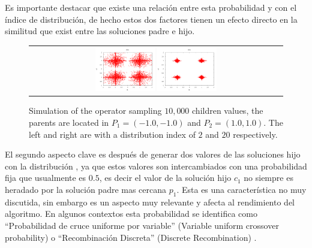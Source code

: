 %
Es importante destacar que existe una relación entre esta probabilidad y con el índice de distribución, de hecho estos dos factores tienen un efecto directo en la similitud que exist entre las soluciones padre e hijo.
%
%
\begin{figure}[t]
\centering
\begin{tabular}{c}
   \includegraphics[width=0.24\textwidth]{img/Operadores/SBX_eta_2.png}  %
   \includegraphics[width=0.24\textwidth]{img/Operadores/SBX_eta_20.png} 
\end{tabular}
\caption{Simulation of the \SBX{} operator sampling $10,000$ children values, the parents are located in $P_1=(-1.0, -1.0)$ and $P_2=(1.0, 1.0)$. The left and right are with a distribution index of $2$ and $20$ respectively.}
\label{fig:Simulation_Case_3}
\end{figure}

El segundo aspecto clave es después de generar dos valores de las soluciones hijo con la distribución \SBX{}, ya que estos valores son intercambiados con una probabilidad fija que usualmente es $0.5$, es decir el valor de la solución hijo $c_1$ no siempre es heradado por la solución padre mas cercana $p_1$.
%
Esta es una característica no muy discutida, sin embargo es un aspecto muy relevante y afecta al rendimiento del algoritmo.
%
En algunos contextos esta probabilidad se identifica como ``Probabilidad de cruce uniforme por variable'' (Variable uniform crossover probability) \cite{tuvsar2007differential} o ``Recombinación Discreta'' (Discrete Recombination) \cite{muhlenbein1993predictive}.

